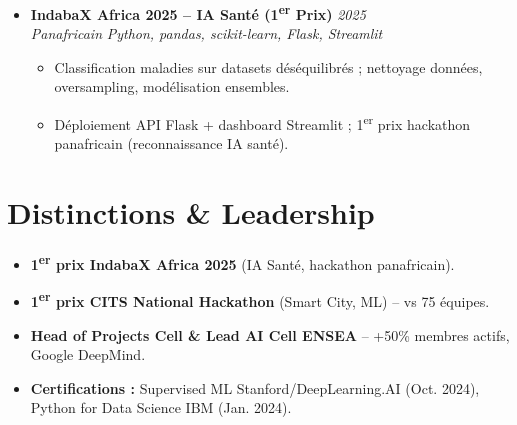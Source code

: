 \documentclass[a4paper,11pt]{article}
\begin{document}
\begin{itemize}[leftmargin=*, label=\tiny$\bullet$, nosep]
    \item \textbf{IndabaX Africa 2025 -- IA Sant\'e (1\textsuperscript{er} Prix)} \hfill \textit{2025} \\
    \textit{Panafricain} \hfill \textit{Python, pandas, scikit-learn, Flask, Streamlit}
    \vspace{-2pt}
    \begin{itemize}[leftmargin=0.4cm, nosep, label=\tiny$\bullet$]
        \item \small{Classification maladies sur datasets d\'es\'equilibr\'es ; nettoyage donn\'ees, oversampling, mod\'elisation ensembles.}
        \item \small{D\'eploiement API Flask + dashboard Streamlit ; 1\textsuperscript{er} prix hackathon panafricain (reconnaissance IA sant\'e).}
    \end{itemize}
\end{itemize}

\section{Distinctions \& Leadership}
\begin{itemize}[leftmargin=*, label=\tiny$\bullet$, nosep]
    \item \small{\textbf{1\textsuperscript{er} prix IndabaX Africa 2025} (IA Sant\'e, hackathon panafricain).}
    \item \small{\textbf{1\textsuperscript{er} prix CITS National Hackathon} (Smart City, ML) -- vs 75 \'equipes.}
    \item \small{\textbf{Head of Projects Cell \& Lead AI Cell ENSEA} -- +50\% membres actifs, Google DeepMind.}
    \item \small{\textbf{Certifications :} Supervised ML Stanford/DeepLearning.AI (Oct. 2024), Python for Data Science IBM (Jan. 2024).}
\end{itemize}
\end{document}
